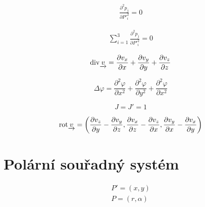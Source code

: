\begin{equation}
\begin{split}
\frac{\partial^2 p_j}{\partial P'^2_i} = 0
\end{split}
\end{equation}

\begin{equation}
\begin{split}
\sum_{i=1}^3 \frac{\partial^2 p_j}{\partial P'^2_i} = 0
\end{split}
\end{equation}

\begin{equation}
\label{eq:kartezsky_ss_div}
\mathrm{div}{\underrightarrow{v}} = \frac{\partial v_x}{\partial x} + \frac{\partial v_y}{\partial y} + \frac{\partial v_z}{\partial z}\end{equation}

\begin{equation}
\label{eq:kartezsky_ss_laplace}
\Delta \varphi = \frac{\partial^2 \varphi}{\partial x^2} + \frac{\partial^2 \varphi}{\partial y^2} + \frac{\partial^2 \varphi}{\partial x^2}\end{equation}

\begin{equation}
\label{eq:kartezsky_ss_j}
J = J' = 1
\end{equation}

\begin{equation}
\label{eq:kartezsky_ss_rotace}
\mathrm{rot} \underrightarrow{v} = \left(\frac{\partial v_z}{\partial y} - \frac{\partial v_y}{\partial z}, \frac{\partial v_x}{\partial z} - \frac{\partial v_z}{\partial x}, \frac{\partial v_y}{\partial x} - \frac{\partial v_x}{\partial y} \right)
\end{equation}

\section{Polární souřadný systém}


\begin{equation}
\begin{split}
P' = (x, y) \\
P = (r, \alpha)
\end{split}
\end{equation}

